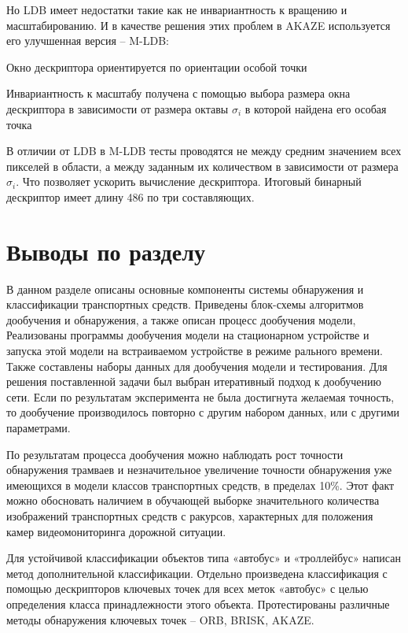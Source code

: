 Но LDB имеет недостатки такие как не инвариантность к вращению и масштабированию. И в качестве решения этих проблем в AKAZE используется его улучшенная версия – M-LDB:
%
\begin{itemize*}
  \item Окно дескриптора ориентируется по ориентации особой точки
  \item Инвариантность к масштабу получена с помощью выбора размера окна дескриптора в зависимости от размера октавы \(\sigma_i\) в которой найдена его особая точка
\end{itemize*}
%

В отличии от LDB в M-LDB тесты проводятся не между средним значением всех пикселей в области, а между заданным их количеством в зависимости от размера \(\sigma_i\). Что позволяет ускорить вычисление дескриптора. Итоговый бинарный дескриптор имеет длину 486 по три составляющих.

\section{Выводы по разделу}

В данном разделе описаны основные компоненты системы обнаружения и классификации транспортных средств. Приведены блок-схемы алгоритмов дообучения и обнаружения, а также описан процесс дообучения модели, Реализованы программы дообучения модели на стационарном устройстве и запуска этой модели на встраиваемом устройстве в режиме рального времени. Также составлены наборы данных для дообучения модели и тестирования. Для решения поставленной задачи был выбран итеративный подход к дообучению сети. Если по результатам эксперимента не была достигнута желаемая точность, то дообучение производилось повторно с другим набором данных, или с другими параметрами. 

По результатам процесса дообучения можно наблюдать рост точности обнаружения трамваев и незначительное увеличение точности обнаружения уже имеющихся в модели классов транспортных средств, в пределах 10\%. Этот факт можно обосновать наличием в обучающей выборке значительного количества изображений транспортных средств с ракурсов, характерных для положения камер видеомониторинга дорожной ситуации. 

Для устойчивой классификации объектов типа «автобус» и «троллейбус» написан метод дополнительной классификации. Отдельно произведена классификация с помощью дескрипторов ключевых точек для всех меток «автобус» с целью определения класса принадлежности этого объекта. Протестированы различные методы обнаружения ключевых точек – ORB, BRISK, AKAZE.

